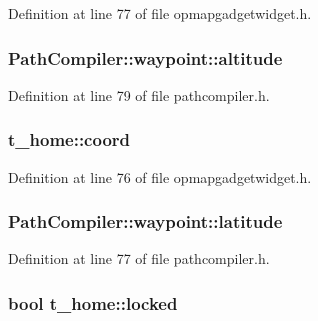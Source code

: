 Definition at line 77 of file opmapgadgetwidget.\-h.

\hypertarget{group___o_p_map_plugin_ga538be1c7d40ec1ac89c5faad4012154e}{
\subsubsection[{altitude}]{ Path\-Compiler\-::waypoint\-::altitude}}\label{group___o_p_map_plugin_ga538be1c7d40ec1ac89c5faad4012154e}


Definition at line 79 of file pathcompiler.\-h.

\hypertarget{group___o_p_map_plugin_ga6324b0912396582281b54bc6d5a6f38a}{
\subsubsection[{coord}]{ t\-\_\-home\-::coord}}\label{group___o_p_map_plugin_ga6324b0912396582281b54bc6d5a6f38a}


Definition at line 76 of file opmapgadgetwidget.\-h.

\hypertarget{group___o_p_map_plugin_ga78f3936ec843f0060648b9503702acd6}{
\subsubsection[{latitude}]{ Path\-Compiler\-::waypoint\-::latitude}}\label{group___o_p_map_plugin_ga78f3936ec843f0060648b9503702acd6}


Definition at line 77 of file pathcompiler.\-h.

\hypertarget{group___o_p_map_plugin_ga4cc9a1ca8d219f1aa6d823fab6080f02}{
\subsubsection[{locked}]{\setlength{\rightskip}{0pt plus 5cm}bool t\-\_\-home\-::locked}}\label{group___o_p_map_plugin_ga4cc9a1ca8d219f1aa6d823fab6080f02}


